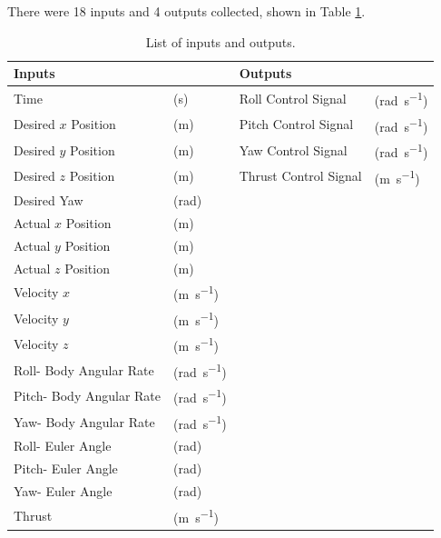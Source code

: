 There were 18 inputs and 4 outputs collected, shown in Table \ref{tab:inputsOutputs}.
\begin{table}[H]
    \centering
    \begin{tabular}{@{}llll@{}}
        \toprule
        \textbf{Inputs}& & \textbf{Outputs}&\\
        \midrule
        Time & (\si{\second})                   & Roll Control Signal &(\si{\radian\per\second})  \\
        Desired $x$ Position & (\si{\meter})           & Pitch Control Signal &(\si{\radian\per\second}) \\
        Desired $y$ Position & (\si{\meter})           & Yaw Control Signal &(\si{\radian\per\second})   \\
        Desired $z$ Position & (\si{\meter})           & Thrust Control Signal &(\si{\meter\per\second})  \\
        Desired Yaw & (\si{\radian})                &       &                       \\
        Actual $x$ Position & (\si{\meter})            &    &                          \\
        Actual $y$ Position & (\si{\meter})            &   &                           \\
        Actual $z$ Position & (\si{\meter})            &   &                           \\
        Velocity $x$ & (\si{\meter\per\second})                 &    &                          \\
        Velocity $y$ & (\si{\meter\per\second})                 &    &                          \\
        Velocity $z$ & (\si{\meter\per\second})                 &   &                           \\
        Roll- Body Angular Rate & (\si{\radian\per\second})  &    &                          \\
        Pitch- Body Angular Rate & (\si{\radian\per\second}) &     &                         \\
        Yaw- Body Angular Rate & (\si{\radian\per\second})   &     &                         \\
        Roll- Euler Angle & (\si{\radian})          &     &                         \\
        Pitch- Euler Angle & (\si{\radian})         &     &                         \\
        Yaw- Euler Angle & (\si{\radian})           &     &                         \\
        Thrust & (\si{\meter\per\second})                 &    &                             \\
        \bottomrule
    \end{tabular}
    \caption{List of inputs and outputs.}
    \label{tab:inputsOutputs}
\end{table}
